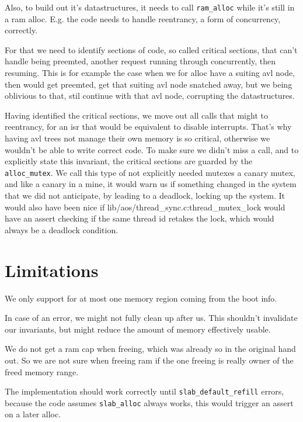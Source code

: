 Also, to build out it's datastructures, it needs to call \verb|ram_alloc| while
it's still in a ram alloc.
E.g. the code needs to handle reentrancy, a form of concurrency, correctly.

For that we need to identify sections of code, so called critical sections, that
can't handle being preemted, another request running through concurrently, then
resuming.
This is for example the case when we for alloc have a suiting avl node, then
would get preemted, get that suiting avl node snatched away, but we being
oblivious to that, stil continue with that avl node, corrupting the
datastructures.

Having identified the critical sections, we move out all calls that might to
reentrancy, for an isr that would be equivalent to disable interrupts.
That's why having avl trees not manage their own memory is so critical,
otherwise we wouldn't be able to write correct code.
To make sure we didn't miss a call, and to explicitly state this invariant, the
critical sections are guarded by the \verb|alloc_mutex|.
We call this type of not explicitly needed mutexes a canary mutex, and like a
canary in a mine, it would warn us if something changed in the system that we
did not anticipate, by leading to a deadlock, locking up the system.
It would also have been nice if lib/aos/thread\_sync.c:thread\_mutex\_lock would
have an assert checking if the same thread id retakes the lock, which would
always be a deadlock condition.

% 
% 
% 

\section{Limitations}

We only support for at most one memory region coming from the boot info.

In case of an error, we might not fully clean up after us.
This shouldn't invalidate our invariants, but might reduce the amount of memory
effectively usable.

We do not get a ram cap when freeing, which was already so in the original hand
out.
So we are not sure when freeing ram if the one freeing is really owner of the
freed memory range.

The implementation should work correctly until \verb|slab_default_refill| errors,
because the code assumes \verb|slab_alloc| always works, this would trigger an
assert on a later alloc.
